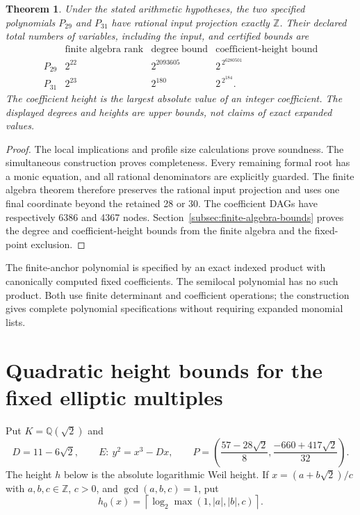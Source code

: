 \documentclass[11pt,a4paper]{article}
\newtheorem{theorem}{Theorem}[section]
\theoremstyle{definition}
\theoremstyle{remark}
\begin{document}
\begin{theorem}\label{thm:u29}\label{thm:u29-preferred}
Under the stated arithmetic hypotheses, the two specified polynomials
$P_{29}$ and $P_{31}$ have rational input projection exactly $\mathbb Z$.
Their declared total numbers of variables, including the input, and
certified bounds are
\[
\begin{array}{c|c|c|c}
&\text{finite algebra rank}&\text{degree bound}&\text{coefficient-height bound}\\\hline
P_{29}&2^{22}&2^{2093605}&2^{\,2^{6280501}}\\
P_{31}&2^{23}&2^{180}&2^{\,2^{184}}.
\end{array}
\]
The coefficient height is the largest absolute value of an integer
coefficient.  The displayed degrees and heights are upper bounds,
not claims of exact expanded values.
\end{theorem}
\begin{proof}
The local implications and profile size calculations prove soundness.
The simultaneous construction proves completeness.  Every remaining
formal root has a monic equation, and all rational denominators are
explicitly guarded.  The finite algebra theorem therefore preserves
the rational input projection and uses one final coordinate beyond
the retained 28 or 30.  The coefficient DAGs have respectively 6386
and 4367 nodes.  Section~\ref{subsec:finite-algebra-bounds} proves
the degree and coefficient-height bounds from the finite algebra
and the fixed-point exclusion.
\end{proof}

The finite-anchor polynomial is specified by an exact indexed product
with canonically computed fixed coefficients.  The semilocal polynomial
has no such product.  Both use finite determinant and coefficient
operations; the construction gives complete polynomial specifications
without requiring expanded monomial lists.


\section{Quadratic height bounds for the fixed elliptic multiples}
\label{sec:quadratic-fixed-height}

Put $K=\mathbb Q(\sqrt2)$ and
\[
 D=11-6\sqrt2,\qquad E:\ y^2=x^3-Dx,\qquad
 P=\left(\frac{57-28\sqrt2}{8},
          \frac{-660+417\sqrt2}{32}\right).
\]
The height $h$ below is the absolute logarithmic Weil height. If
$x=(a+b\sqrt2)/c$ with $a,b,c\in\mathbb Z$, $c>0$, and
$\gcd(a,b,c)=1$, put
\[
 h_0(x)=\left\lceil\log_2\max(1,|a|,|b|,c)\right\rceil.
\]
\end{document}
